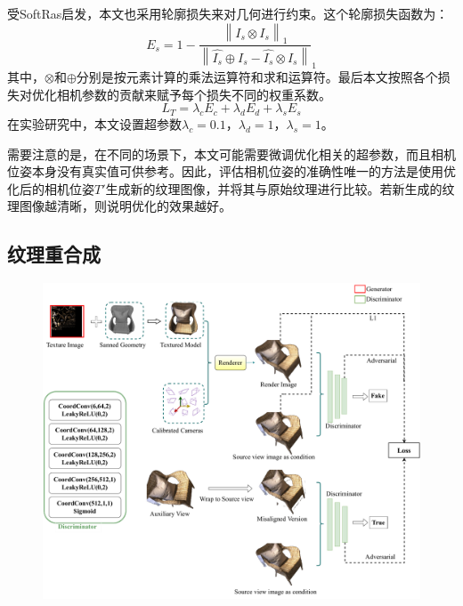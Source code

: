 受SoftRas启发，本文也采用轮廓损失来对几何进行约束。这个轮廓损失函数为：
\begin{equation}
	E_s = 1 - \frac{\left \| \hat{I_s}\otimes I_s  \right \|_1 }{\left \| \hat{I_s}\oplus  I_s- \hat{I_s}\otimes I_s \right \| }_1  
\end{equation}
其中，$\otimes $和$\oplus $分别是按元素计算的乘法运算符和求和运算符。最后本文按照各个损失对优化相机参数的贡献来赋予每个损失不同的权重系数。
\begin{equation}
	L_T = \lambda_c E_c + \lambda_d E_d +\lambda_s E_s \label{pose}
\end{equation}
在实验研究中，本文设置超参数$\lambda_c = 0.1$，$\lambda_d = 1$，$\lambda_s = 1$。\par
需要注意的是，在不同的场景下，本文可能需要微调优化相关的超参数，而且相机位姿本身没有真实值可供参考。因此，评估相机位姿的准确性唯一的方法是使用优化后的相机位姿$T'$生成新的纹理图像，并将其与原始纹理进行比较。若新生成的纹理图像越清晰，则说明优化的效果越好。

%
\subsection{纹理重合成}

\begin{figure}[ht]
    \centering
    \includegraphics[width=1\columnwidth]{pic/work1/Texture.pdf}

    \label{fig:Texture}
\end{figure}

